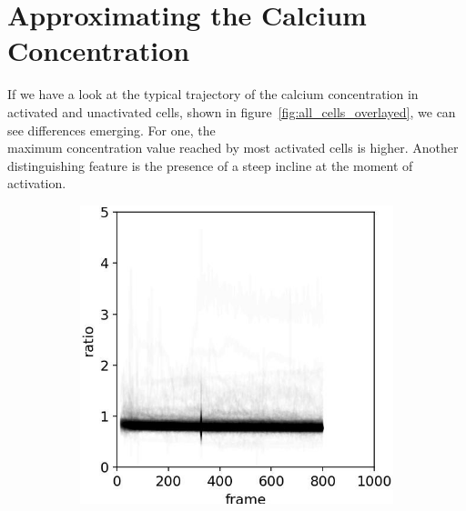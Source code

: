 \chapter{Approximating the Calcium Concentration}
\label{chapter:approximating}

If we have a look at the typical trajectory of the calcium concentration in activated and unactivated cells, shown in figure~\ref{fig:all_cells_overlayed}, we can see differences emerging. For one, the\\ maximum concentration value reached by most activated cells is higher. Another\\ distinguishing feature is the presence of a steep incline at the moment of activation.

\begin{figure}[h]
	\centering
	\begin{subfigure}{0.45\linewidth}
		\includegraphics[width=\textwidth]{fig/all_cells_overlayed_mouse_neg}
	\end{subfigure}
	\hfill
	\begin{subfigure}{0.45\linewidth}

\end{subfigure}
\end{figure}
